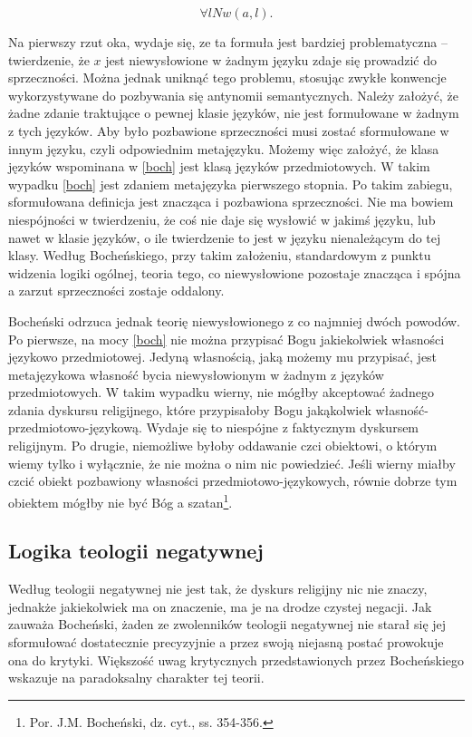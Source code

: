 \begin{equation}\label{boch}
\forall l Nw(a, l).
\end{equation}

Na pierwszy rzut oka, wydaje się, ze ta formuła jest bardziej
problematyczna -- twierdzenie, że $x$ jest niewysłowione w żadnym języku
zdaje się prowadzić do sprzeczności. Można jednak uniknąć tego
problemu, stosując zwykłe konwencje wykorzystywane do pozbywania się
antynomii semantycznych. Należy założyć, że żadne zdanie traktujące o
pewnej klasie języków, nie jest formułowane w żadnym z tych języków.
Aby było pozbawione sprzeczności musi zostać sformułowane w innym
języku, czyli odpowiednim metajęzyku. Możemy więc założyć, że klasa
języków wspominana w \ref{boch} jest klasą języków przedmiotowych. W takim
wypadku \ref{boch} jest zdaniem metajęzyka pierwszego stopnia. Po takim
zabiegu, sformułowana definicja jest znacząca i pozbawiona
sprzeczności. Nie ma bowiem niespójności w twierdzeniu, że coś nie daje
się wysłowić w jakimś języku, lub nawet w klasie języków, o ile
twierdzenie to jest w języku nienależącym do tej klasy. Według
Bocheńskiego, przy takim założeniu, standardowym z punktu widzenia
logiki ogólnej, teoria tego, co niewysłowione pozostaje znacząca i
spójna a zarzut sprzeczności zostaje oddalony.

Bocheński odrzuca jednak teorię niewysłowionego z co najmniej dwóch
powodów. Po pierwsze, na mocy \ref{boch} nie można przypisać Bogu
jakiekolwiek własności językowo przedmiotowej. Jedyną własnością, jaką
możemy mu przypisać, jest metajęzykowa własność bycia niewysłowionym w
żadnym z języków przedmiotowych. W takim wypadku wierny, nie mógłby
akceptować żadnego zdania dyskursu religijnego, które przypisałoby Bogu
jakąkolwiek własność-przedmiotowo-językową. Wydaje się to niespójne z
faktycznym dyskursem religijnym. Po drugie, niemożliwe byłoby oddawanie
czci obiektowi, o którym wiemy tylko i wyłącznie, że nie można o nim
nic powiedzieć. Jeśli wierny miałby czcić obiekt pozbawiony własności
przedmiotowo-językowych, równie dobrze tym obiektem mógłby nie być Bóg
a szatan\footnote{Por. J.M. Bocheński, dz. cyt., ss. 354-356. }.


\subsection{Logika teologii negatywnej}
Według teologii negatywnej nie jest tak, że dyskurs religijny nic nie
znaczy, jednakże jakiekolwiek ma on znaczenie, ma je na drodze czystej
negacji. Jak zauważa Bocheński, żaden ze zwolenników teologii
negatywnej nie starał się jej sformułować dostatecznie precyzyjnie a
przez swoją niejasną postać prowokuje ona do krytyki. Większość uwag
krytycznych przedstawionych przez Bocheńskiego wskazuje na paradoksalny
charakter tej teorii.

